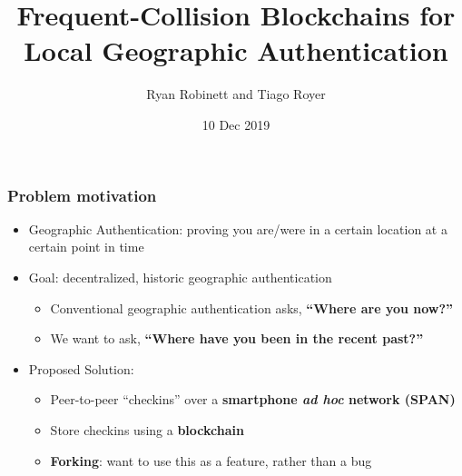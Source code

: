\documentclass{beamer}
\begin{document}
\captionsetup{font=scriptsize, labelfont=scriptsize}

\title{Frequent-Collision Blockchains for Local Geographic Authentication}
\author{Ryan Robinett and Tiago Royer}
\date{10 Dec 2019}

\begin{frame}
    \titlepage
\end{frame}

\begin{frame}
	\frametitle{Problem motivation}

	\begin{itemize}
		\item Geographic Authentication:
			proving you are/were in a certain location
			at a certain point in time
		\item Goal: decentralized, historic geographic authentication
			\begin{itemize}
				\item Conventional geographic authentication asks, \textbf{``Where are you now?''}
				\item We want to ask, \textbf{``Where have you been in the recent past?''}
			\end{itemize}
		\item Proposed Solution:
			\begin{itemize}
				\item Peer-to-peer ``checkins'' over a \textbf{smartphone
					\textit{ad hoc} network (SPAN)}
				\item Store checkins using a \textbf{blockchain}
				\item \textbf{Forking}: want to use this as a feature,
					rather than a bug
			\end{itemize}
	\end{itemize}
\end{frame}
\end{document}
